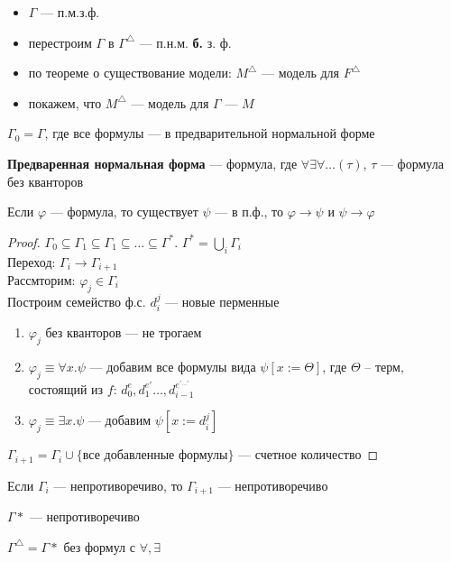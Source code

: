 \documentclass[english]{article}
\begin{document}
\begin{itemize}
	\item \(\Gamma\) --- п.м.з.ф.
	\item перестроим \(\Gamma\) в \(\Gamma^\triangle\) --- п.н.м. \textbf{б.} з. ф.
	\item по теореме о существование модели: \(M^\triangle\) --- модель для \(F^\triangle\)
	\item покажем, что \(M^\triangle\) --- модель для \(\Gamma\) --- \(M\)
\end{itemize}
\(\Gamma_0 = \Gamma\), где все формулы --- в предварительной нормальной форме
\begin{definition}
	\textbf{Предваренная нормальная форма} --- формула, где \(\forall \exists \forall \dots(\tau)\), \(\tau\) --- формула без кванторов
	\label{orgfe8da1f}
\end{definition}
\begin{theorem}
	Если \(\varphi\) --- формула, то существует \(\psi\) --- в п.ф., то \(\varphi \to \psi\) и \(\psi \to \varphi\)
	\label{org7f1c5f4}
\end{theorem}
\begin{proof}
	\(\Gamma_0 \subseteq \Gamma_1 \subseteq \Gamma_1 \subseteq \dots \subseteq \Gamma^*\). \(\Gamma^* = \bigcup_i \Gamma_i\) \\
	Переход: \(\Gamma_i \to \Gamma_{i + 1}\) \\
	Рассмторим: \(\varphi_j \in \Gamma_i\) \\
	Построим семейство ф.с. \(d^j_i\) --- новые перменные
	\begin{enumerate}
		\item \(\varphi_j\) без кванторов --- не трогаем
		\item \(\varphi_j \equiv \forall x. \psi\) --- добавим все формулы вида \(\psi[x := \Theta]\), где \(\Theta\) -- терм, состоящий из \(f\): \(d_0^e, d_1^{e'} \dots , d_{i - 1}^{e^{'\dots'}}\)
		\item \(\varphi_j \equiv \exists x. \psi\) --- добавим \(\psi[x:=d^j_i]\)
	\end{enumerate}
	\(\Gamma_{i + 1} = \Gamma_i \cup \{\text{все добавленные формулы}\}\) --- счетное количество
\end{proof}
\begin{theorem}
	Если \(\Gamma_i\) --- непротиворечиво, то \(\Gamma_{i + 1}\) --- непротиворечиво
	\label{orgd2c04d9}
\end{theorem}
\begin{theorem}
	\(\Gamma*\) --- непротиворечиво
	\label{org7c3b9d0}
\end{theorem}
\begin{corollary}
	\(\Gamma^\triangle = \Gamma*\) без формул с \(\forall, \exists\)
	\label{org0c856c3}
\end{corollary}
\end{document}
